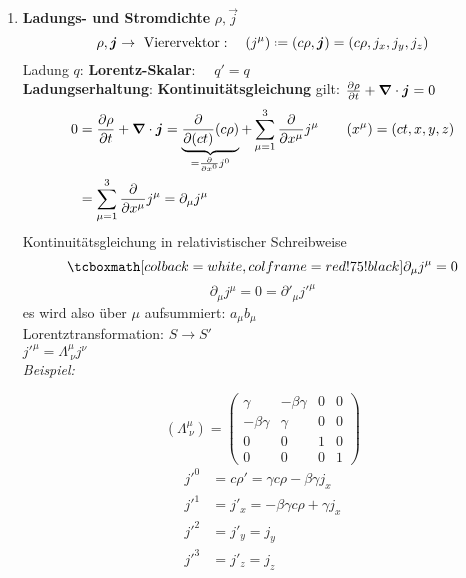 \begin{enumerate}[1)]
	\item \textbf{Ladungs- und Stromdichte} $ \rho, \vec{j} $
	\begin{equation*}
	\rho , \vec{j} \to \tx{ Vierervektor}: \quad (j^{\mu}) \defeq ( c \rho, \vec{j}) = ( c \rho, j_x, j_y, j_z) 
	\end{equation*}
	Ladung $ q $: \textbf{Lorentz-Skalar}: $ \quad q' = q $\\
	\textbf{Ladungserhaltung}: \textbf{Kontinuitätsgleichung} gilt: $ \frac{\partial \rho}{\partial t} + \bm{\nabla} \cdot \bm{j} = 0 $
	\begin{align*}
	0 &= \frac{\partial \rho}{\partial t} + \bm{\nabla} \cdot \bm{j} = \underbrace{\frac{\partial }{\partial (ct)} (c \rho)}_{= \frac{\partial }{\partial x^{0}} j^{0}} + \sum_{\mu=1}^{3} \frac{\partial }{\partial x^{\mu}} j^{\mu} \qquad (x^{\mu}) = (ct, x, y, z)\\
	&= \sum_{\mu=1}^{3} \frac{\partial }{\partial x^{\mu}} j^{\mu} = \partial_{\mu} j^{\mu}
	\end{align*}
	Kontinuitätsgleichung in relativistischer Schreibweise
	\begin{equation*}
	\rmbox{\partial _{\mu} j^{\mu} = 0}
	\end{equation*}
	\begin{equation*}
	\partial_{\mu} j^{\mu} = 0 = \partial'_{\mu} j'^{\mu}
	\end{equation*}
	es wird also über $ \mu $ aufsummiert: $ a_{\mu} b_{\mu} $\\[10pt]
	Lorentztransformation: $ S \to S' $\\
	$ j'^{\mu} = \Lambda^{\mu}_{\ \nu} j^{\nu} $\\
	\emph{Beispiel:}\\
	\begin{minipage}{.5\linewidth}
		\begin{equation*}
		\left(\Lambda ^{\mu}_{\ \nu}\right) = \begin{pmatrix}
		\gamma & - \beta \gamma & 0 & 0 \\
		- \beta \gamma & \gamma & 0 & 0 \\
		0 & 0 & 1 & 0 \\
		0 & 0 & 0 & 1
		\end{pmatrix}
		\end{equation*}
		\begin{align*}
		j'^{0} &= c\rho ' = \gamma c \rho - \beta \gamma j_x \\
		j'^{1} &= j'_{x} = - \beta \gamma c \rho + \gamma j_x \\
		j'^{2} &= j'_{y} = j_y \\
		j'^{3} &= j'_{z} = j_z \\

\end{align*}
\end{minipage}
\end{enumerate}
